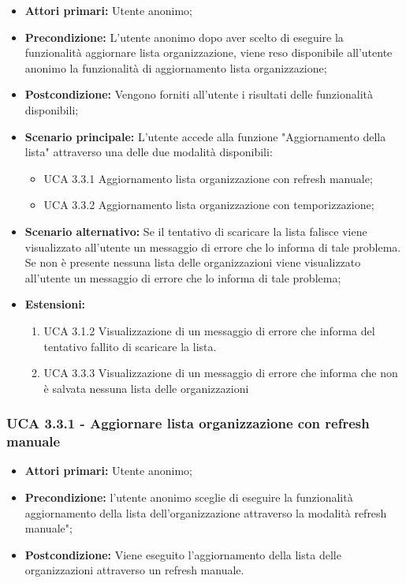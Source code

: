 \begin{itemize} 
	\item \textbf{Attori primari:} Utente anonimo;
	\item \textbf{Precondizione:}  L'utente anonimo dopo aver scelto di eseguire la funzionalità aggiornare lista organizzazione, viene reso disponibile all'utente anonimo la funzionalità di aggiornamento lista  organizzazione;
	\item \textbf{Postcondizione:} Vengono forniti all'utente i risultati delle funzionalità disponibili;
	\item \textbf{Scenario principale:}  L'utente accede alla funzione "Aggiornamento della lista" attraverso una delle due modalità disponibili:
	\begin{itemize}
		\item UCA 3.3.1 Aggiornamento lista organizzazione con refresh manuale;
		\item UCA 3.3.2 Aggiornamento lista organizzazione con temporizzazione;
	\end{itemize}
	\item \textbf{Scenario alternativo:} Se il tentativo di scaricare la lista falisce viene visualizzato all'utente un messaggio di errore che lo informa di tale problema. Se non è presente nessuna lista delle organizzazioni viene visualizzato all'utente un messaggio di errore che lo informa di tale problema;
	\item \textbf{Estensioni:}
	\begin{enumerate}
		\item UCA 3.1.2 Visualizzazione di un messaggio di errore che informa del tentativo fallito di scaricare la lista.
		\item UCA 3.3.3 Visualizzazione di un messaggio di errore che informa che non è salvata nessuna lista delle organizzazioni
	\end{enumerate}
\end{itemize}

\subsubsection{UCA 3.3.1 - Aggiornare lista organizzazione con refresh manuale}%
\begin{itemize}
	\item \textbf{Attori primari:} Utente anonimo;
	\item \textbf{Precondizione:} l'utente anonimo sceglie di eseguire la funzionalità aggiornamento della lista dell'organizzazione attraverso la modalità refresh manuale";
	\item \textbf{Postcondizione:} Viene eseguito l'aggiornamento della lista delle organizzazioni attraverso un refresh manuale.
	
\end{itemize}

